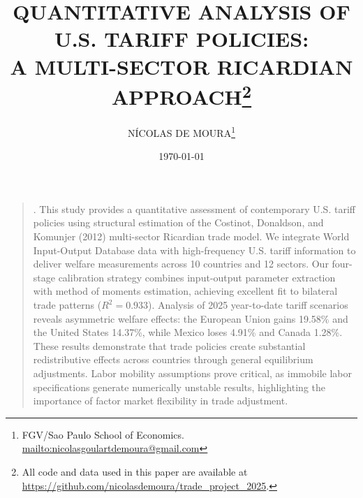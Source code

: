 \documentclass[a4paper, 12pt]{article}
\renewenvironment{abstract}
{\small\begin{quote}\noindent \par{\sc \abstractname.}}
{\noindent\end{quote}}
\begin{document}
\title{\normalsize\MakeUppercase{\bfseries 
 Quantitative Analysis of U.S. Tariff Policies:\\A Multi-Sector Ricardian Approach}\footnote{All code and data used in this paper are available at \url{https://github.com/nicolasdemoura/trade_project_2025}.}}
\date{\footnotesize\MakeUppercase\today}
\author{
    \small\MakeUppercase{Nícolas de Moura}\footnote{FGV/Sao Paulo School of Economics. \url{mailto:nicolasgoulartdemoura@gmail.com}}
}
\maketitle

\begin{abstract}
This study provides a quantitative assessment of contemporary U.S. tariff policies using structural estimation of the Costinot, Donaldson, and Komunjer (2012) multi-sector Ricardian trade model. We integrate World Input-Output Database data with high-frequency U.S. tariff information to deliver welfare measurements across 10 countries and 12 sectors. Our four-stage calibration strategy combines input-output parameter extraction with method of moments estimation, achieving excellent fit to bilateral trade patterns ($R^2 = 0.933$). Analysis of 2025 year-to-date tariff scenarios reveals asymmetric welfare effects: the European Union gains 19.58\% and the United States 14.37\%, while Mexico loses 4.91\% and Canada 1.28\%. These results demonstrate that trade policies create substantial redistributive effects across countries through general equilibrium adjustments. Labor mobility assumptions prove critical, as immobile labor specifications generate numerically unstable results, highlighting the importance of factor market flexibility in trade adjustment.
\end{abstract}









\newpage



\newpage


% 
%
\end{document}
